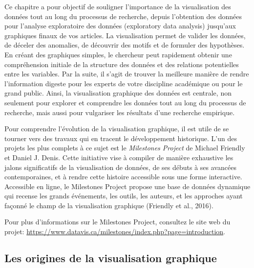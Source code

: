 \documentclass[
  letterpaper,
  DIV=11,
  numbers=noendperiod]{scrreprt}
\begin{document}
Ce chapitre a pour objectif de souligner l'importance de la
visualisation des données tout au long du processus de recherche, depuis
l'obtention des données pour l'analyse exploratoire des données
(exploratory data analysis) jusqu'aux graphiques finaux de vos articles.
La visualisation permet de valider les données, de déceler des
anomalies, de découvrir des motifs et de formuler des hypothèses. En
créant des graphiques simples, le chercheur peut rapidement obtenir une
compréhension initiale de la structure des données et des relations
potentielles entre les variables. Par la suite, il s'agit de trouver la
meilleure manière de rendre l'information digeste pour les experts de
votre discipline académique ou pour le grand public. Ainsi, la
visualisation graphique des données est centrale, non seulement pour
explorer et comprendre les données tout au long du processus de
recherche, mais aussi pour vulgariser les résultats d'une recherche
empirique.

Pour comprendre l'évolution de la visualisation graphique, il est utile
de se tourner vers des travaux qui en tracent le développement
historique. L'un des projets les plus complets à ce sujet est le
\emph{Milestones Project} de Michael Friendly et Daniel J. Denis. Cette
initiative vise à compiler de manière exhaustive les jalons
significatifs de la visualisation de données, de ses débuts à ses
avancées contemporaines, et à rendre cette histoire accessible sous une
forme interactive. Accessible en ligne, le Milestones Project propose
une base de données dynamique qui recense les grands événements, les
outils, les auteurs, et les approches ayant façonné le champ de la
visualisation graphique (Friendly et al., 2016).

\begin{tcolorbox}[enhanced jigsaw, breakable, rightrule=.15mm, colbacktitle=quarto-callout-note-color!10!white, colback=white, leftrule=.75mm, colframe=quarto-callout-note-color-frame, arc=.35mm, toptitle=1mm, bottomtitle=1mm, toprule=.15mm, opacitybacktitle=0.6, bottomrule=.15mm, opacityback=0, title=\textcolor{quarto-callout-note-color}{\faInfo}\hspace{0.5em}{Note}, left=2mm, titlerule=0mm, coltitle=black]

Pour plus d'informations sur le Milestones Project, consultez le site
web du projet:
\url{https://www.datavis.ca/milestones/index.php?page=introduction}.

\end{tcolorbox}

\subsection{Les origines de la visualisation
graphique}\label{les-origines-de-la-visualisation-graphique}
\end{document}
